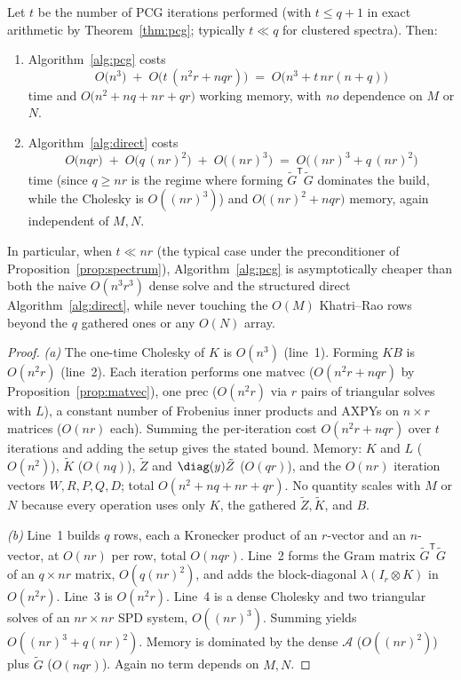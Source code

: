 \begin{theorem}[Complexity]\label{thm:complexity}
Let $t$ be the number of PCG iterations performed (with $t\le q+1$ in exact arithmetic
by Theorem~\ref{thm:pcg}; typically $t\ll q$ for clustered spectra). Then:
\begin{enumerate}[label=(\alph*)]
  \item Algorithm~\ref{alg:pcg} costs
        \[
          O\big(n^3\big)\;+\;O\big(t\,(n^2r+nqr)\big)
          \;=\;O\!\big(n^3+t\,nr(n+q)\big)
        \]
        time and $O\big(n^2+nq+nr+qr\big)$ working memory, with \emph{no} dependence on
        $M$ or $N$.
  \item Algorithm~\ref{alg:direct} costs
        \[
          O\big(nqr\big)\;+\;O\big(q\,(nr)^2\big)\;+\;O\big((nr)^3\big)
          \;=\;O\!\big((nr)^3+q\,(nr)^2\big)
        \]
        time (since $q\ge nr$ is the regime where forming
        $\tilde G^{\mathsf T}\tilde G$ dominates the build, while the Cholesky is
        $O((nr)^3)$) and $O\big((nr)^2+nqr\big)$ memory, again independent of $M,N$.
\end{enumerate}
In particular, when $t\ll nr$ (the typical case under the preconditioner of
Proposition~\ref{prop:spectrum}), Algorithm~\ref{alg:pcg} is asymptotically cheaper than
both the naive $O(n^3r^3)$ dense solve and the structured direct
Algorithm~\ref{alg:direct}, while never touching the $O(M)$ Khatri--Rao rows beyond the
$q$ gathered ones or any $O(N)$ array.
\end{theorem}
\begin{proof}
\emph{(a)} The one-time Cholesky of $K$ is $O(n^3)$ (line~1). Forming $KB$ is
$O(n^2r)$ (line~2). Each iteration performs one $\mathrm{matvec}$
($O(n^2r+nqr)$ by Proposition~\ref{prop:matvec}), one $\mathrm{prec}$ ($O(n^2r)$ via
$r$ pairs of triangular solves with $L$), a constant number of Frobenius inner products
and AXPYs on $n\times r$ matrices ($O(nr)$ each). Summing the per-iteration cost
$O(n^2r+nqr)$ over $t$ iterations and adding the setup gives the stated bound. Memory:
$K$ and $L$ ($O(n^2)$), $\tilde K$ ($O(nq)$), $\tilde Z$ and $\diag(y)\tilde Z$
($O(qr)$), and the $O(nr)$ iteration vectors $W,R,P,Q,D$; total
$O(n^2+nq+nr+qr)$. No quantity scales with $M$ or $N$ because every operation uses only
$K$, the gathered $\tilde Z,\tilde K$, and $B$.

\emph{(b)} Line~1 builds $q$ rows, each a Kronecker product of an $r$-vector and an
$n$-vector, at $O(nr)$ per row, total $O(nqr)$. Line~2 forms the Gram matrix
$\tilde G^{\mathsf T}\tilde G$ of an $q\times nr$ matrix, $O(q(nr)^2)$, and adds the
block-diagonal $\lambda(I_r\otimes K)$ in $O(n^2r)$. Line~3 is $O(n^2r)$. Line~4 is a
dense Cholesky and two triangular solves of an $nr\times nr$ SPD system,
$O((nr)^3)$. Summing yields $O((nr)^3+q(nr)^2)$. Memory is dominated by the dense
$\mathcal A$ ($O((nr)^2)$) plus $\tilde G$ ($O(nqr)$). Again no term depends on $M,N$.
\end{proof}

